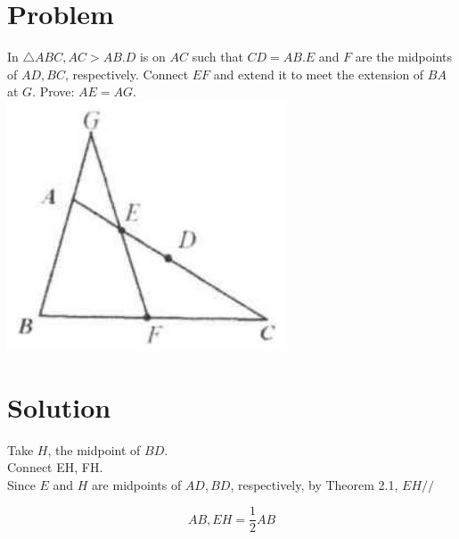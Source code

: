 \documentclass{article}
\begin{document}
\section*{Problem}
In \(\triangle A B C, A C>A B . D\) is on \(A C\) such that \(C D=A B . E\) and \(F\) are the midpoints of \(A D, B C\), respectively. Connect \(E F\) and extend it to meet the extension of \(B A\) at \(G\). Prove: \(A E=A G\).\\
\centering
\includegraphics[width=\textwidth]{images/045(1).jpg}

\section*{Solution}
Take \(H\), the midpoint of \(B D\).\\
Connect EH, FH.\\
Since \(E\) and \(H\) are midpoints of \(A D, B D\), respectively, by Theorem 2.1, \(E H / /\)

\[
A B, E H=\frac{1}{2} A B
\]
\end{document}
